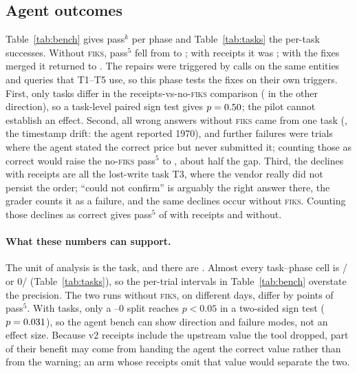 \documentclass[10pt]{article}
\newcommand{\fiks}{\textsc{fiks}}
\begin{document}
\begin{table}[t]
\centering\small
\caption{Repair loop per drift. ``Min.\ to PR'' runs from the captured violation to the opened pull request, including the CI wait. Cost is the Agent SDK's API-price estimate.}
\label{tab:loop}
\resizebox{\linewidth}{!}{}
\end{table}

\subsection{Agent outcomes}
Table~\ref{tab:bench} gives pass$^k$ per phase and Table~\ref{tab:tasks} the per-task successes.
Without \fiks, pass$^5$ fell from \pFiveA{} to \pFiveBd{}; with receipts it was \pFiveB; with the fixes merged it returned to \pFiveC{}. The repairs were triggered by calls on the same entities and queries that T1--T5 use, so this phase tests the fixes on their own triggers.
First, only \pairWins{} tasks differ in the receipts-vs-no-\fiks{} comparison (\pairLosses{} in the other direction), so a task-level paired sign test gives $p=0.50$; the pilot cannot establish an effect.
Second, all \wrongBd{} wrong answers without \fiks{} came from one task (\wrongTasksBd, the timestamp drift: the agent reported 1970), and \noAnswerBd{} further failures were trials where the agent stated the correct price but never submitted it; counting those as correct would raise the no-\fiks{} pass$^5$ to \pFiveBdSens{}, about half the gap.
Third, the \declinedB{} declines with receipts are all the lost-write task T3, where the vendor really did not persist the order; ``could not confirm'' is arguably the right answer there, the grader counts it as a failure, and the same \declinedBd{} declines occur without \fiks. Counting those declines as correct gives pass$^5$ of \pFiveBTthree{} with receipts and \pFiveBdTthree{} without.

\paragraph{What these numbers can support.} The unit of analysis is the task, and there are \nTasks. Almost every task--phase cell is \kTrials/\kTrials{} or 0/\kTrials{} (Table~\ref{tab:tasks}), so the per-trial intervals in Table~\ref{tab:bench} overstate the precision. The two runs without \fiks, on different days, differ by \runToRunPts{} points of pass$^5$. With \nTasks{} tasks, only a \minSplitForSig--0 split reaches $p<0.05$ in a two-sided sign test ($p=0.031$), so the agent bench can show direction and failure modes, not an effect size. Because v2 receipts include the upstream value the tool dropped, part of their benefit may come from handing the agent the correct value rather than from the warning; an arm whose receipts omit that value would separate the two.
\end{document}
